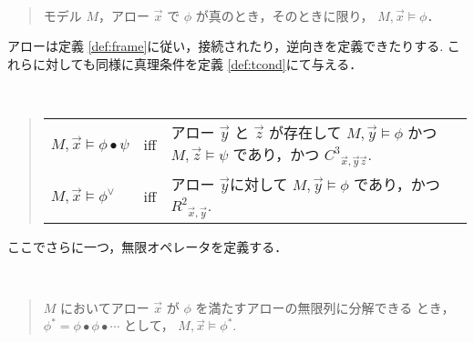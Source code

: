 \begin{my-def}[真理条件]~\label{def:valid}
\begin{quote}
モデル $M$，アロー ${\vec x}$ で $\phi$ が真のとき，そのときに限り，
$M,{\vec x}\models \phi$．
\end{quote}
\end{my-def}
アローは定義 \ref{def:frame}に従い，接続されたり，逆向きを定義できたりする.
これらに対しても同様に真理条件を定義 \ref{def:tcond}にて与える．
\begin{my-def}[オペレーション]\label{def:tcond}~
\begin{quote}
\begin{tabular}[b]{llp{8cm}}
$M,{\vec x}\models \phi\bullet\psi$ & iff &アロー $\vec y$ と
$\vec z$ が存在して $M,{\vec y}\models\phi$ かつ $M,{\vec
z}\models\psi$ であり，かつ ${C^{3}}_{{\vec x},{\vec y}{\vec z}}$.\\ 
$M,{\vec x}\models \phi^{\vee}$& iff &アロー $\vec y$に対して $M,{\vec
y}\models\phi$ であり，かつ ${R^{2}}_{{\vec x},{\vec y}}$.\\
\end{tabular}
\end{quote}
\end{my-def}
ここでさらに一つ，無限オペレータを定義する．
\begin{my-def}[無限オペレータ]~\label{def:infini}
\begin{quote}
$M$ においてアロー $\vec x$ が $\phi$ を満たすアローの無限列に分解できる
とき，$\phi^{\ast} =
\phi\bullet\phi\bullet\cdots$ として，
$M,{\vec x}\models \phi^{\ast}$.
\end{quote}
\end{my-def}

